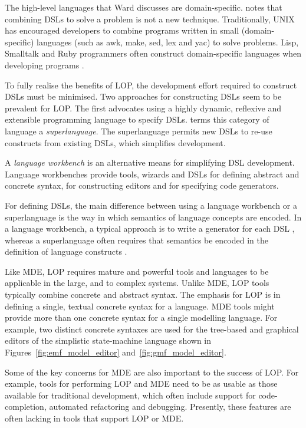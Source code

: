 The high-level languages that Ward discusses are domain-specific. \cite{fowler10dsls} notes that combining DSLs to solve a problem is not a new technique. Traditionally, UNIX has encouraged developers to combine programs written in small (domain-specific) languages (such as awk, make, sed, lex and yac) to solve problems. Lisp, Smalltalk and Ruby programmers often construct domain-specific languages when developing programs \cite{graham93lisp}.

To fully realise the benefits of LOP, the development effort required to construct DSLs must be minimised. Two approaches for constructing DSLs seem to be prevalent for LOP. The first advocates using a highly dynamic, reflexive and extensible programming language to specify DSLs. \cite{clark08superlanguages} terms this category of language a \textit{superlanguage}. The superlanguage permits new DSLs to re-use constructs from existing DSLs, which simplifies development.

A \textit{language workbench} \cite[ch. 9]{fowler10dsls} is an alternative means for simplifying DSL development. Language workbenches provide tools, wizards and DSLs for defining abstract and concrete syntax, for constructing editors and for specifying code generators.

For defining DSLs, the main difference between using a language workbench or a superlanguage is the way in which semantics of language concepts are encoded. In a language workbench, a typical approach is to write a generator for each DSL \cite{fowler10dsls}, whereas a superlanguage often requires that semantics be encoded in the definition of language constructs \cite{clark08superlanguages}.

Like MDE, LOP requires mature and powerful tools and languages to be applicable in the large, and to complex systems. Unlike MDE, LOP tools typically combine concrete and abstract syntax. The emphasis for LOP is in defining a single, textual concrete syntax for a language. MDE tools might provide more than one concrete syntax for a single modelling language. For example, two distinct concrete syntaxes are used for the tree-based and graphical editors of the simplistic state-machine language shown in Figures~\ref{fig:emf_model_editor} and~\ref{fig:gmf_model_editor}.

Some of the key concerns for MDE are also important to the success of LOP. For example, tools for performing LOP and MDE need to be as usable as those available for traditional development, which often include support for code-completion, automated refactoring and debugging. Presently, these features are often lacking in tools that support LOP or MDE.

